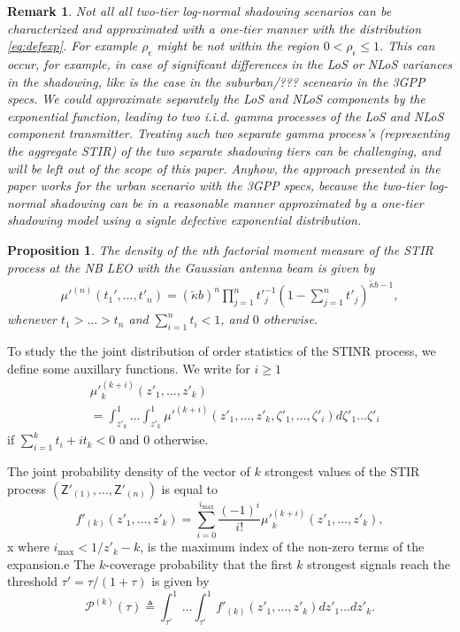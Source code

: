 \documentclass[lettersize,journal]{IEEEtran}
\newtheorem{prop}[theorem]{Proposition}
\newtheorem*{remark}{Remark}
\begin{document}
\begin{remark}
  Not all all two-tier log-normal shadowing scenarios can be characterized and approximated with a one-tier manner with the distribution \eqref{eq:defexp}. For example $\rho_{\epsilon}$ might be not within the region $0<\rho_{\epsilon} \leq 1$. This can occur, for example, in case of significant differences in the LoS or NLoS variances in the shadowing, like is the case in the suburban/??? sceneario in the 3GPP specs. We could approximate separately the LoS and NLoS components by the exponential function, leading to two i.i.d. gamma processes of the LoS and NLoS component transmitter. Treating such two separate gamma process's (representing the aggregate STIR) of the two separate shadowing tiers can be challenging, and will be left out of the scope of this paper. Anyhow, the approach presented in the paper works for the urban scenario with the 3GPP specs, because the two-tier log-normal shadowing can be in a reasonable manner approximated by a one-tier shadowing model using a signle defective exponential distribution.
\end{remark}

\begin{prop}
  The density of the nth factorial moment measure of the STIR process at the NB LEO with the Gaussian antenna beam is given by
  \begin{align}
    \label{eq:factorialmoment}
    \mu'^{(n)}(t_1',\dots,t'_n) = (\tilde{\kappa}b)^n\prod_{j=1}^n{t'}_{j}^{-1}\left(1- \sum_{j=1}^nt'_j \right)^{\tilde{\kappa}b-1},       
  \end{align}
  whenever $t_1>\dots >t_n$ and $\sum_{i=1}^n t_i <1$, and $0$ otherwise.
\end{prop}
To study the the joint distribution of order statistics of the STINR process, we define some auxillary functions. We write for $i\geq 1$
\begin{align}
  \label{eq:auxillary}
  &{\mu'}_k^{(k+i)}(z'_1,\dots,z'_k) \nonumber \\
  &= \int_{z'_k}^1 \dots \int_{z'_k}^1 {\mu'}^{(k+i)}(z'_1,\dots,z'_k,\zeta'_1,\dots,\zeta'_i) d\zeta'_1 \dots \zeta'_i
\end{align}
if $\sum_{i=1}^k t_i + it_k <0$ and $0$ otherwise.


The joint probability density of the vector of $k$ strongest values of the STIR process $(\mathsf{Z}'_{(1)}, \dots, \mathsf{Z}'_{(n)})$ is equal to
\begin{equation}
  \label{eq:jointprobability}
  f'_{(k)}(z'_1,\dots,z'_k)= \sum^{i_{\text{max}}}_{i=0}\frac{(-1)^i}{i!}{\mu'}_k^{(k+i)}(z'_1,\dots,z'_k),
\end{equation}x
where $i_{\text{max}}<1/z'_k-k$, is the maximum index of the non-zero terms of the expansion.e
The $k$-coverage probability that the first $k$ strongest signals reach the threshold $\tau' =\tau/(1+\tau)$ is given by
\begin{equation}
  \mathcal{P}^{(k)}(\tau) \triangleq  \int_{\tau'}^1\dots \int_{\tau'}^1 f'_{(k)}({z'_1},\dots,{z'_k})dz'_1 \dots d{z'_k}.
\end{equation}
\end{document}
